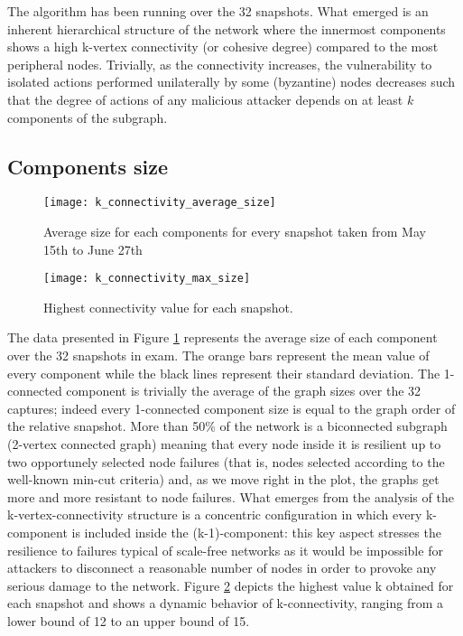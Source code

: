 	The algorithm has been running over the 32 snapshots. What emerged is an inherent hierarchical structure of the network where the innermost components shows a high k-vertex connectivity (or cohesive degree) compared to the most peripheral nodes. Trivially, as the connectivity increases, the vulnerability to isolated actions performed unilaterally by some (byzantine) nodes decreases such that the degree of actions of any malicious attacker depends on at least $k$ components of the subgraph.
	
	\subsection{Components size}
	
	\begin{figure}[ht!]
		\texttt{[image: k\_connectivity\_average\_size]}\\
		\caption{Average size for each components for every snapshot taken from May 15th to June 27th}
		\label{monthly_connectivity_average}
	\end{figure}
	
	\begin{figure}
		\texttt{[image: k\_connectivity\_max\_size]}
		\caption{Highest connectivity value for each snapshot.}
		\label{monthly_connectivity_max_size}
	\end{figure}
	
	The data presented in Figure \ref{monthly_connectivity_average} represents the average size of each component over the 32 snapshots in exam. The orange bars represent the mean value of every component while the black lines represent their standard deviation.	The 1-connected component is trivially the average of the graph sizes over the 32 captures; indeed every 1-connected component size is equal to the graph order of the relative snapshot. More than 50\% of the network is a biconnected subgraph (2-vertex connected graph) meaning that every node inside it is resilient up to two opportunely selected node failures (that is, nodes selected according to the well-known min-cut criteria) and, as we move right in the plot, the graphs get more and more resistant to node failures. What emerges from the analysis of the k-vertex-connectivity structure is a concentric configuration in which every k-component is included inside the (k-1)-component: this key aspect stresses the resilience to failures typical of scale-free networks as it would be impossible for attackers to disconnect a reasonable number of nodes in order to provoke any serious damage to the network. Figure \ref{monthly_connectivity_max_size} depicts the highest value k obtained for each snapshot and shows a dynamic behavior of k-connectivity, ranging from a lower bound of 12 to an upper bound of 15.
	
